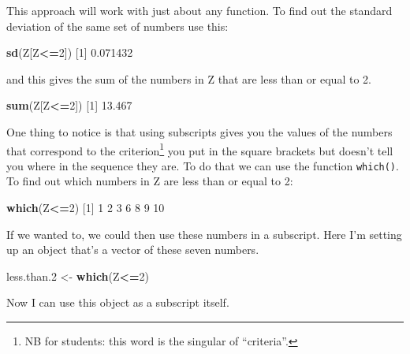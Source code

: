\documentclass[
]{book}
\newenvironment{Shaded}{\begin{snugshade}}{\end{snugshade}}
\newcommand{\DecValTok}[1]{\textcolor[rgb]{0.00,0.00,0.81}{#1}}
\newcommand{\FloatTok}[1]{\textcolor[rgb]{0.00,0.00,0.81}{#1}}
\newcommand{\KeywordTok}[1]{\textcolor[rgb]{0.13,0.29,0.53}{\textbf{#1}}}
\newcommand{\NormalTok}[1]{#1}
\newcommand{\OperatorTok}[1]{\textcolor[rgb]{0.81,0.36,0.00}{\textbf{#1}}}
\newcommand{\StringTok}[1]{\textcolor[rgb]{0.31,0.60,0.02}{#1}}
\begin{document}
This approach will work with just about any function. To find out the standard deviation of the same set of numbers use this:

\begin{Shaded}
\begin{Highlighting}[]
\KeywordTok{sd}\NormalTok{(Z[Z}\OperatorTok{<=}\DecValTok{2}\NormalTok{])}
\NormalTok{[}\DecValTok{1}\NormalTok{] }\FloatTok{0.071432}
\end{Highlighting}
\end{Shaded}

and this gives the sum of the numbers in Z that are less than or equal to 2.

\begin{Shaded}
\begin{Highlighting}[]
\KeywordTok{sum}\NormalTok{(Z[Z}\OperatorTok{<=}\DecValTok{2}\NormalTok{])}
\NormalTok{[}\DecValTok{1}\NormalTok{] }\FloatTok{13.467}
\end{Highlighting}
\end{Shaded}

One thing to notice is that using subscripts gives you the values of the numbers that correspond to the criterion\footnote{NB for students: this word is the singular of ``criteria''.} you put in the square brackets but doesn't tell you where in the sequence they are. To do that we can use the function \texttt{which()}. To find out which numbers in Z are less than or equal to 2:

\begin{Shaded}
\begin{Highlighting}[]
\KeywordTok{which}\NormalTok{(Z}\OperatorTok{<=}\DecValTok{2}\NormalTok{)}
\NormalTok{[}\DecValTok{1}\NormalTok{]  }\DecValTok{1}  \DecValTok{2}  \DecValTok{3}  \DecValTok{6}  \DecValTok{8}  \DecValTok{9} \DecValTok{10}
\end{Highlighting}
\end{Shaded}

If we wanted to, we could then use these numbers in a subscript. Here I'm setting up an object that's a vector of these seven numbers.

\begin{Shaded}
\begin{Highlighting}[]
\NormalTok{less.than}\FloatTok{.2}\NormalTok{ <-}\StringTok{ }\KeywordTok{which}\NormalTok{(Z}\OperatorTok{<=}\DecValTok{2}\NormalTok{)}
\end{Highlighting}
\end{Shaded}

Now I can use this object as a subscript itself.
\end{document}
